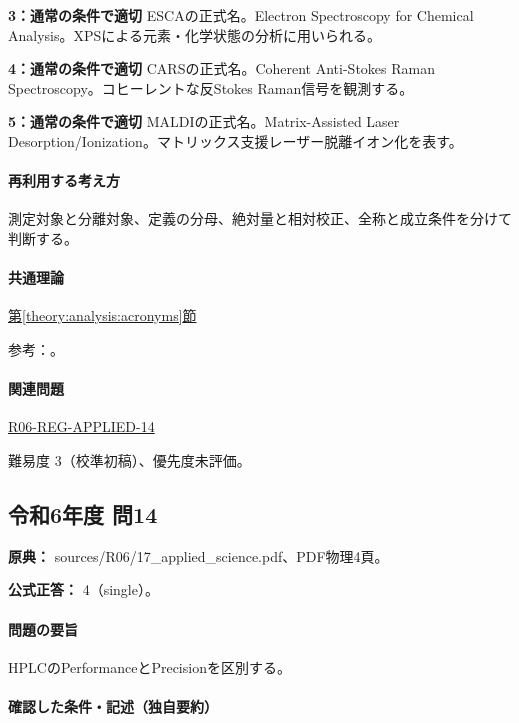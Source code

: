 \noindent\textbf{3：通常の条件で適切} ESCAの正式名。Electron Spectroscopy for Chemical Analysis。XPSによる元素・化学状態の分析に用いられる。\par

\noindent\textbf{4：通常の条件で適切} CARSの正式名。Coherent Anti-Stokes Raman Spectroscopy。コヒーレントな反Stokes Raman信号を観測する。\par

\noindent\textbf{5：通常の条件で適切} MALDIの正式名。Matrix-Assisted Laser Desorption/Ionization。マトリックス支援レーザー脱離イオン化を表す。\par

\paragraph{再利用する考え方} 測定対象と分離対象、定義の分母、絶対量と相対校正、全称と成立条件を分けて判断する。

\paragraph{共通理論} \hyperref[theory:analysis:acronyms]{第\ref*{theory:analysis:acronyms}節}

\par 参考：\cite{analysis49_hplc_ref,analysis49_esr_ref,analysis49_maldi_ref,analysis49_cars_ref}。

\paragraph{関連問題} \hyperref[q:r06-reg-applied-14]{R06-REG-APPLIED-14}

\par 難易度 3（校準初稿）、優先度未評価。

\subsection{令和6年度 問14}
\label{q:r06-reg-applied-14}

\noindent\textbf{原典：} sources/R06/17\_applied\_science.pdf、PDF物理4頁。

\textbf{公式正答：} 4（single）。

\paragraph{問題の要旨} HPLCのPerformanceとPrecisionを区別する。

\paragraph{確認した条件・記述（独自要約）}\mbox{}\par

